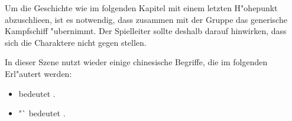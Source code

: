 \begin{remarks}
	Um die Geschichte wie im folgenden Kapitel mit einem letzten H"ohepunkt abzuschlie\3en, ist es notwendig, dass \xl{} zusammen mit der Gruppe das generische Kampfschiff "ubernimmt. Der Spielleiter sollte deshalb darauf hinwirken, dass sich die Charaktere nicht gegen \xl{} stellen.

	In dieser Szene nutzt \xl{} wieder einige chinesische Begriffe, die im folgenden Erl"autert werden:

	\begin{itemize}
		\item {} bedeutet .
		\item "` bedeutet .		
	\end{itemize}
	 
\end{remarks}
